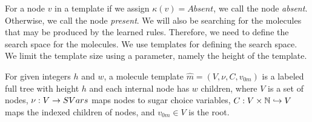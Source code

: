 For a node $v$ in a template if we assign $\kappa(v) = Absent$,
we call the node {\em absent}. Otherwise, we call the node {\em present}.
We will also be searching for the molecules that may be produced by the learned rules.
Therefore, we need to define the search space for the molecules.
We use templates for defining the search space.
We limit the template size using a parameter,
namely the height of the template.
\begin{df}
For given integers $h$ and $w$,
a {molecule template} $\hat{m} = (V, \nu, C, v_{0m})$ is a labeled full tree with height $h$ and 
each internal node has $w$ children, where 
$V$ is a set of nodes, $\nu : V \rightarrow SVars$ maps nodes to sugar choice variables,
$C : V \times \mathbb{N} \hookrightarrow V$ maps the indexed children of nodes,
and
$v_{0m} \in V$ is the root.
\end{df}


